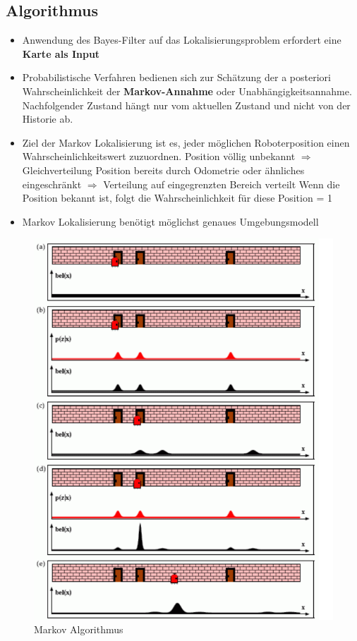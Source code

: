 \subsection{Algorithmus}
\begin{itemize}
	\item Anwendung des Bayes-Filter auf das Lokalisierungsproblem erfordert eine \textbf{Karte als Input}
	\item Probabilistische Verfahren bedienen sich zur Schätzung der a posteriori Wahrscheinlichkeit der \textbf{Markov-Annahme} oder Unabhängigkeitsannahme.
	Nachfolgender Zustand hängt nur vom aktuellen Zustand und nicht von der Historie ab.
	\item Ziel der Markov Lokalisierung ist es, jeder möglichen Roboterposition einen Wahrscheinlichkeitswert zuzuordnen.
	\subitem Position völlig unbekannt $\Rightarrow$ Gleichverteilung
	\subitem Position bereits durch Odometrie oder ähnliches eingeschränkt $\Rightarrow$ Verteilung auf eingegrenzten Bereich verteilt
	\subitem Wenn die Position bekannt ist, folgt die Wahrscheinlichkeit für diese Position = 1
\end{itemize}
\begin{itemize}
	\item Markov Lokalisierung benötigt möglichst genaues Umgebungsmodell
\end{itemize}
\begin{figure}[H]
	\begin{center}
		\includegraphics[scale=0.4]{Resources/PNG/MarkovAlgorithmus.PNG}
		\caption{Markov Algorithmus}
		\label{fig:Resources/PNG/MarkovAlgorithmus.PNG}
	\end{center}
\end{figure}
\newpage

